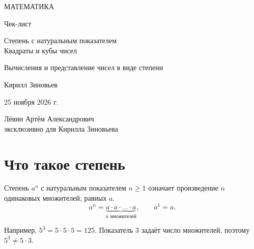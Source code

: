 \documentclass[a4paper,12pt]{article}
\begin{document}
\begin{titlepage}
\centering
\vspace*{27mm}
{\Large\color{darkaccent} МАТЕМАТИКА\par}
\vspace{15mm}
{\Huge Чек-лист\par}
\vspace{10mm}
{\LARGE\color{accent} Степень с натуральным показателем\\[3pt] Квадраты и кубы чисел\par}
\vspace{14mm}
{\large Вычисления и представление чисел в виде степени\par}
\vfill
{\large Кирилл Зиновьев\par}
\vspace{9mm}
{25 ноября 2026 г.\par}
\vspace{15mm}
{\small Лёвин Артём Александрович\\эксклюзивно для Кирилла Зиновьева\par}
\vspace{19mm}
\vspace*{3mm}
\end{titlepage}
\setcounter{page}{1}
\section{Что такое степень}
Степень $a^n$ с натуральным показателем $n\ge 1$ означает произведение $n$ одинаковых множителей, равных $a$.
\[
 a^n=\underbrace{a\cdot a\cdot\ldots\cdot a}_{n\text{ множителей}},\qquad a^1=a.
\]
\begin{center}
\end{center}
Например, $5^3=5\cdot5\cdot5=125$. Показатель 3 задаёт число множителей, поэтому $5^3\ne 5\cdot3$.
\end{document}
